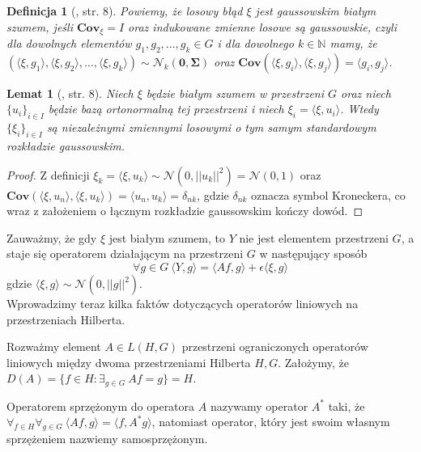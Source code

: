 \documentclass[man,mfiu]{mgrwms}
\newtheorem{df}{Definicja}[chapter]
\newtheorem{lm}{Lemat}[chapter]
\begin{document}
\begin{df}[\cite{iphde}, str. 8] Powiemy, że losowy błąd $\xi$ jest gaussowskim białym szumem, jeśli $\textbf{Cov}_{\xi}=I$ oraz indukowane zmienne losowe są gaussowskie, czyli dla dowolnych elementów $g_1,g_2,\dots,g_k\in G$ i dla dowolnego $k\in \mathbb{N}$ mamy, że \\$(\langle \xi,g_1\rangle,\langle \xi,g_2\rangle,\dots,\langle \xi,g_k\rangle)\sim\mathcal{N}_k(\pmb{0},\pmb{\Sigma})$ oraz $\textbf{Cov}(\langle \xi,g_i\rangle , \langle \xi , g_j\rangle)=\langle g_i, g_j\rangle$.
\end{df}
\begin{lm}[\cite{iphde}, str. 8]\label{lemat1}
Niech $\xi$ będzie białym szumem w przestrzeni $G$ oraz niech $\{u_i\}_{i\in I}$ będzie bazą ortonormalną tej przestrzeni i niech $\xi_i=\langle \xi,u_i\rangle$. Wtedy $\{\xi_i\}_{i\in I}$ są niezależnymi zmiennymi losowymi o tym samym standardowym rozkładzie gaussowskim.
\end{lm}
\begin{proof}
Z definicji $\xi_k=\langle \xi,u_k\rangle\sim \mathcal{N}(0,||u_k||^2)=\mathcal{N}(0,1)$ oraz $\textbf{Cov}(\langle \xi, u_n\rangle,\langle \xi, u_k\rangle)=\langle u_n,u_k\rangle=\delta_{nk}$, gdzie $\delta_{nk}$ oznacza symbol Kroneckera, co wraz z założeniem o łącznym rozkładzie gaussowskim kończy dowód.
\end{proof}

Zauważmy, że gdy $\xi$ jest białym szumem, to $Y$ nie jest elementem przestrzeni $G$, a staje się operatorem działającym na przestrzeni $G$ w następujący sposób
\begin{displaymath}
\forall {g\in G}\ \langle Y,g\rangle =\langle Af,g\rangle + \epsilon\langle \xi, g\rangle
\end{displaymath}
gdzie $\langle \xi, g\rangle\sim\mathcal{N}(0,||g||^2)$.\\

Wprowadzimy teraz kilka faktów dotyczących operatorów liniowych na przestrzeniach Hilberta.

Rozważmy element $A\in L(H,G)$  przestrzeni ograniczonych operatorów liniowych między dwoma przestrzeniami Hilberta $H,G$. Założymy, że $D(A)=\{f\in H\colon \exists_{g\in G}\ Af=g\}=H$.

Operatorem sprzężonym do operatora $A$ nazywamy operator $A^*$ taki, że\\ $\forall_{f\in H}\forall_{g\in G}\ \langle Af,g\rangle=\langle f,A^*g\rangle$, natomiast operator, który jest swoim własnym sprzężeniem nazwiemy samosprzężonym.
\end{document}
